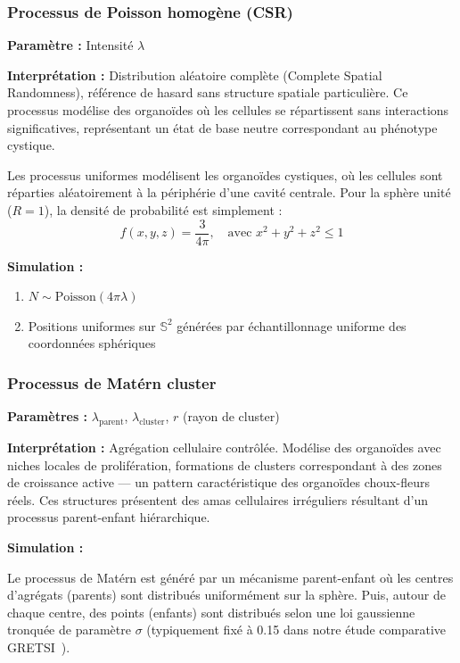 \subsubsection{Processus de Poisson homogène (CSR)}

\textbf{Paramètre :} Intensité $\lambda$

\textbf{Interprétation :} Distribution aléatoire complète (Complete Spatial Randomness), référence de hasard sans structure spatiale particulière. Ce processus modélise des organoïdes où les cellules se répartissent sans interactions significatives, représentant un état de base neutre correspondant au phénotype cystique.

Les processus uniformes modélisent les organoïdes cystiques, où les cellules sont réparties aléatoirement à la périphérie d'une cavité centrale. Pour la sphère unité ($R=1$), la densité de probabilité est simplement :
\[
f(x,y,z) = \frac{3}{4\pi}, \quad \text{avec } x^2+y^2+z^2 \leq 1
\]

\textbf{Simulation :}
\begin{enumerate}
    \item $N \sim \text{Poisson}(4\pi \lambda)$
    \item Positions uniformes sur $\mathbb{S}^2$ générées par échantillonnage uniforme des coordonnées sphériques
\end{enumerate}

\subsubsection{Processus de Matérn cluster}

\textbf{Paramètres :} $\lambda_{\text{parent}}$, $\lambda_{\text{cluster}}$, $r$ (rayon de cluster)

\textbf{Interprétation :} Agrégation cellulaire contrôlée. Modélise des organoïdes avec niches locales de prolifération, formations de clusters correspondant à des zones de croissance active — un pattern caractéristique des organoïdes choux-fleurs réels. Ces structures présentent des amas cellulaires irréguliers résultant d'un processus parent-enfant hiérarchique.

\textbf{Simulation :}

Le processus de Matérn est généré par un mécanisme parent-enfant où les centres d'agrégats (parents) sont distribués uniformément sur la sphère. Puis, autour de chaque centre, des points (enfants) sont distribués selon une loi gaussienne tronquée de paramètre $\sigma$ (typiquement fixé à 0.15 dans notre étude comparative GRETSI~\cite{Martin2025GRETSI2}).

